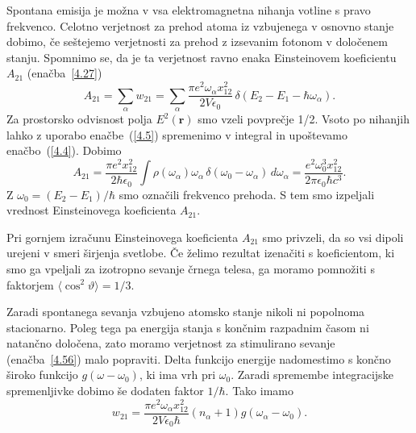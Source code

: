 Spontana emisija je možna v vsa elektromagnetna nihanja votline s
pravo frekvenco. Celotno verjetnost za prehod atoma iz vzbujenega
v osnovno stanje dobimo, če seštejemo verjetnosti za prehod z izsevanim fotonom 
v določenem stanju. Spomnimo se, da je ta verjetnost ravno enaka 
Einsteinovem koeficientu $A_{21}$ (enačba~\ref{4.27})
\begin{equation}
A_{21}=\sum_{\alpha}w_{21}=\sum_{\alpha}\frac{\pi 
e^{2}\omega_{\alpha}x_{12}^{2}}{2V\epsilon_{0}}\,\delta(E_{2}-E_{1}-\hbar\omega_{\alpha}).
\label{4.57}
\end{equation}
Za prostorsko odvisnost polja $E^{2}(\mathbf{r})$ smo vzeli povprečje
1/2. Vsoto po nihanjih lahko z uporabo enačbe~(\ref{4.5}) spremenimo v integral
in upoštevamo enačbo~(\ref{4.4}). Dobimo
\begin{equation}
A_{21}=\frac{\pi e^{2}x_{12}^{2}}{2\hbar\epsilon_{0}}\int\rho(\omega_{\alpha})\omega_\alpha\, 
\delta(\omega_{0}-\omega_{\alpha})\, d\omega_{\alpha}=\frac{e^{2}\omega_{0}^{3}x_{12}^{2}}{2\pi\epsilon_{0}\hbar c^{3}}.
\label{4.58}
\end{equation}
 Z $\omega_{0}=(E_{2}-E_{1})/\hbar$ smo označili frekvenco prehoda. S tem smo 
 izpeljali vrednost Einsteinovega koeficienta $A_{21}$. 
\begin{remark}
Pri gornjem izračunu Einsteinovega koeficienta $A_{21}$ smo privzeli, da so vsi dipoli urejeni  
 v smeri širjenja svetlobe. Če želimo rezultat izenačiti s koeficientom, ki smo ga vpeljali
 za izotropno sevanje črnega telesa, ga moramo pomnožiti s faktorjem $\langle \cos^2\vartheta
 \rangle = 1/3$.
\end{remark}

Zaradi spontanega sevanja vzbujeno atomsko stanje nikoli ni popolnoma
stacionarno. Poleg tega pa energija stanja s končnim razpadnim časom ni natančno
določena, zato moramo verjetnost za stimulirano sevanje (enačba~\ref{4.56}) malo 
popraviti. Delta funkcijo energije nadomestimo s končno široko  
funkcijo $g(\omega-\omega_0)$, ki ima vrh pri $\omega_{0}$. Zaradi 
spremembe integracijske spremenljivke dobimo še dodaten faktor $1/\hbar$. Tako imamo 
\begin{equation}
w_{21}=\frac{\pi e^{2}\omega_{\alpha}x_{12}^{2}}{2V\epsilon_{0}\hbar}
(n_{\alpha}+1)g(\omega_{\alpha}-\omega_0).
\label{4.59}
\end{equation}

